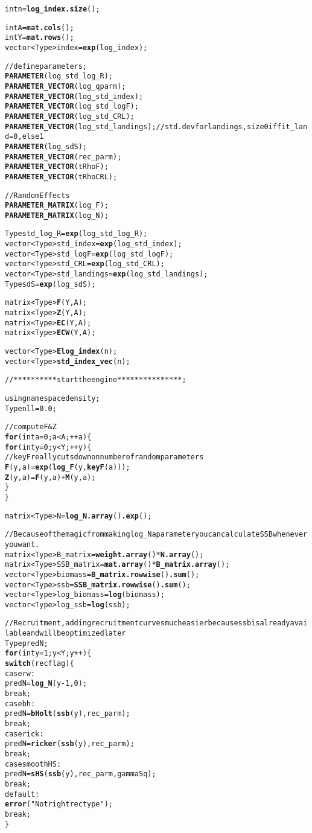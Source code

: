 \documentclass[11pt]{article}\usepackage[]{graphicx}\usepackage[]{color}
\makeatletter
\newcommand{\hlstr}[1]{\textcolor[rgb]{0.192,0.494,0.8}{#1}}%
\newcommand{\hlkwd}[1]{\textcolor[rgb]{0.737,0.353,0.396}{\textbf{#1}}}%
\newenvironment{kframe}{%
 \def\at@end@of@kframe{}%
 \ifinner\ifhmode%
  \def\at@end@of@kframe{\end{minipage}}%
  \begin{minipage}{\columnwidth}%
 \fi\fi%
 \def\FrameCommand##1{\hskip\@totalleftmargin \hskip-\fboxsep
 \colorbox{shadecolor}{##1}\hskip-\fboxsep
     \hskip-\linewidth \hskip-\@totalleftmargin \hskip\columnwidth}%
 \MakeFramed {\advance\hsize-\width
   \@totalleftmargin\z@ \linewidth\hsize
   \@setminipage}}%
 {\par\unskip\endMakeFramed%
 \at@end@of@kframe}
\newenvironment{knitrout}{}{} %
\makeatother
\begin{document}
\begin{appendices}
\begin{knitrout}
\begin{kframe}
\begin{alltt}
int n = \hlkwd{log_index.size}();

int A = \hlkwd{mat.cols}();
int Y = \hlkwd{mat.rows}();
vector<Type> index = \hlkwd{exp}(log_index);

//define parameters;  
\hlkwd{PARAMETER}(log_std_log_R);
\hlkwd{PARAMETER_VECTOR}(log_qparm);
\hlkwd{PARAMETER_VECTOR}(log_std_index); 
\hlkwd{PARAMETER_VECTOR}(log_std_logF);          
\hlkwd{PARAMETER_VECTOR}(log_std_CRL);
\hlkwd{PARAMETER_VECTOR}(log_std_landings); //std. dev for landings, size 0 if fit_land=0, else 1
\hlkwd{PARAMETER}(log_sdS);
\hlkwd{PARAMETER_VECTOR}(rec_parm);
\hlkwd{PARAMETER_VECTOR}(tRhoF);
\hlkwd{PARAMETER_VECTOR}(tRhoCRL);

//Random Effects
\hlkwd{PARAMETER_MATRIX}(log_F);    
\hlkwd{PARAMETER_MATRIX}(log_N);

Type std_log_R = \hlkwd{exp}(log_std_log_R); 
vector<Type> std_index = \hlkwd{exp}(log_std_index);
vector<Type> std_logF = \hlkwd{exp}(log_std_logF); 
vector<Type> std_CRL = \hlkwd{exp}(log_std_CRL);
vector<Type> std_landings = \hlkwd{exp}(log_std_landings);
Type sdS = \hlkwd{exp}(log_sdS);
  
matrix<Type> \hlkwd{F}(Y,A);    
matrix<Type> \hlkwd{Z}(Y,A);  
matrix<Type> \hlkwd{EC}(Y,A);  
matrix<Type> \hlkwd{ECW}(Y,A); 

vector<Type> \hlkwd{Elog_index}(n); 
vector<Type> \hlkwd{std_index_vec}(n);
   
//**********  start the engine ***************;

using namespace density;
Type nll = 0.0;  

//compute F & Z
\hlkwd{for}(int a = 0;a < A;++a)\{ 
  \hlkwd{for}(int y = 0;y < Y;++y)\{
    //keyF really cuts down on number of random parameters
    \hlkwd{F}(y,a) = \hlkwd{exp}(\hlkwd{log_F}(y,\hlkwd{keyF}(a)));
    \hlkwd{Z}(y,a) = \hlkwd{F}(y,a) + \hlkwd{M}(y,a);
  \}
\}

matrix<Type> N = \hlkwd{log_N.array}()\hlkwd{.exp}();

//Because of the magic from making log_N a parameter you can calculate SSB whenever you want.
matrix<Type> B_matrix = \hlkwd{weight.array}()*\hlkwd{N.array}();
matrix<Type> SSB_matrix = \hlkwd{mat.array}()*\hlkwd{B_matrix.array}();
vector<Type> biomass = \hlkwd{B_matrix.rowwise}()\hlkwd{.sum}();
vector<Type> ssb = \hlkwd{SSB_matrix.rowwise}()\hlkwd{.sum}();
vector<Type> log_biomass = \hlkwd{log}(biomass);
vector<Type> log_ssb = \hlkwd{log}(ssb);       



//Recruitment, adding recruitment curves much easier because ssb is already available and will be optimized later
Type predN;
\hlkwd{for}(int y =1;y < Y;y++)\{
  \hlkwd{switch}(recflag)\{
  case rw:
    predN = \hlkwd{log_N}(y-1,0);
    break;
  case bh:
    predN = \hlkwd{bHolt}(\hlkwd{ssb}(y),rec_parm);
    break;
  case rick:
    predN = \hlkwd{ricker}(\hlkwd{ssb}(y),rec_parm);
    break;
  case smoothHS:
    predN = \hlkwd{sHS}(\hlkwd{ssb}(y),rec_parm,gammaSq);
    break;
  default:
    \hlkwd{error}(\hlstr{"Not right rec type"});
    break;
  \}
  

\end{alltt}
\end{kframe}
\end{knitrout}
\end{appendices}
\end{document}
